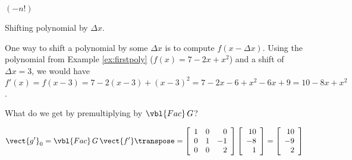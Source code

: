 $(-n!)$


\begin{example}
 Shifting polynomial by $\Delta x$.
\end{example}

One way to shift a polynomial by some $\Delta x$ is to compute $f(x - \Delta x)$.
Using the polynomial from Example \ref{ex:firstpoly} ($f(x)= 7 - 2x + x^2$) and a shift of $\Delta x = 3$, we would have $f'(x) = f(x-3) = 7 - 2 (x-3) + (x-3)^2 = 7 - 2x - 6 + x^2 - 6x + 9 = 10 - 8x + x^2$.

What do we get by premultiplying by $\vbl{Fac}\,G$?

\[
 \vect{g'}_0 =
 \vbl{Fac}\,G\,\vect{f'} \transpose =
 \left[\begin{array}{rrr}
   1 & 0 &  0 \\
   0 & 1 & -1 \\
   0 & 0 &  2 \\
 \end{array}\right]
 \left[\begin{array}{r}
   10 \\ -8 \\ 1 \\
 \end{array}\right]
 =
 \left[\begin{array}{r}
   10 \\ -9 \\ 2 \\
 \end{array}\right]
\]



